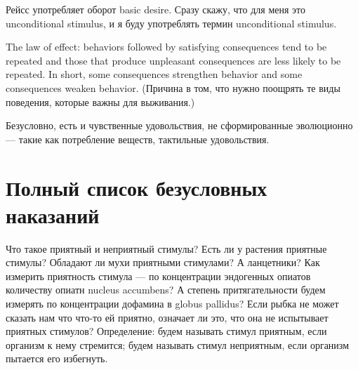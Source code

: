 \documentclass[11pt]{article}
\theoremstyle{remark}
\theoremstyle{definition}
\begin{document}










Рейсс употребляет оборот basic desire. Сразу скажу, что для меня это unconditional stimulus, и я буду употреблять термин unconditional stimulus.


The law of effect: behaviors followed by satisfying consequences tend to be repeated and those that produce unpleasant consequences are less likely to be repeated. In short, some consequences strengthen behavior and some consequences weaken behavior. (Причина в том, что нужно поощрять те виды поведения, которые важны для выживания.)



Безусловно, есть и чувственные удовольствия, не сформированные эволюционно --- такие как потребление веществ, тактильные удовольствия.


\section{Полный список безусловных наказаний}

Что такое приятный и неприятный стимулы? Есть ли у растения приятные стимулы? Обладают ли мухи приятными стимулами? А ланцетники? Как измерить приятность стимула --- по концентрации эндогенных опиатов количеству опиатн nucleus accumbens? А степень притягательности будем измерять по концентрации дофамина в globus pallidus? Если рыбка не может сказать нам что что-то ей приятно, означает ли это, что она не испытывает приятных стимулов? Определение: будем называть стимул приятным, если организм к нему стремится; будем называть стимул неприятным, если организм пытается его избегнуть.







\end{document}
